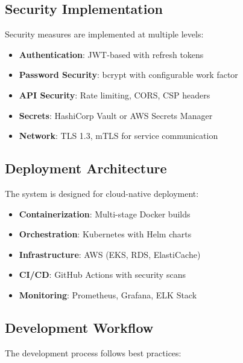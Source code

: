 \subsection{Security Implementation}

Security measures are implemented at multiple levels:

\begin{itemize}
    \item \textbf{Authentication}: JWT-based with refresh tokens
    \item \textbf{Password Security}: bcrypt with configurable work factor
    \item \textbf{API Security}: Rate limiting, CORS, CSP headers
    \item \textbf{Secrets}: HashiCorp Vault or AWS Secrets Manager
    \item \textbf{Network}: TLS 1.3, mTLS for service communication
\end{itemize}

\subsection{Deployment Architecture}

The system is designed for cloud-native deployment:

\begin{itemize}
    \item \textbf{Containerization}: Multi-stage Docker builds
    \item \textbf{Orchestration}: Kubernetes with Helm charts
    \item \textbf{Infrastructure}: AWS (EKS, RDS, ElastiCache)
    \item \textbf{CI/CD}: GitHub Actions with security scans
    \item \textbf{Monitoring}: Prometheus, Grafana, ELK Stack
\end{itemize}

\subsection{Development Workflow}

The development process follows best practices:

